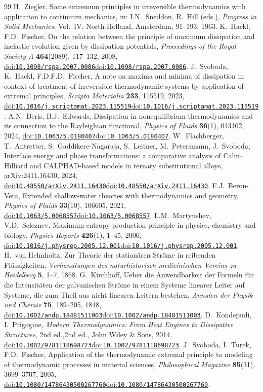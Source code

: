 \documentclass[12pt]{article}
\newif\ifhighlight \highlightfalse
\newif\ifhighlightfirst \highlightfirstfalse
\DeclareRobustCommand{\chg}[1]{\ifhighlight\ifhighlightfirst\textcolor{revised}{#1}\else#1\fi\else#1\fi}
\providecommand{\doi}[1]{\chg{\href{https://doi.org/#1}{doi:\nolinkurl{#1}}}}
\begin{document}
\begin{thebibliography}{99}
 H.~Ziegler, Some extremum principles in irreversible thermodynamics with application to continuum mechanics, in: I.N.~Sneddon, R.~Hill (eds.), \textit{Progress in Solid Mechanics}, Vol.~IV, North-Holland, Amsterdam, 91--193, 1963.
 K.~Hackl, F.D.~Fischer, On the relation between the principle of maximum dissipation and inelastic evolution given by dissipation potentials, \textit{Proceedings of the Royal Society A} \textbf{464}(2089), 117--132, 2008, \doi{10.1098/rspa.2007.0086}.
 J.~Svoboda, K.~Hackl, \chg{F.D.}~Fischer, A note on maxima and minima of dissipation in context of treatment of irreversible thermodynamic systems by application of extremal principles, \textit{Scripta Materialia} \textbf{233}, 115519, 2023, \doi{10.1016/j.scriptamat.2023.115519}.
 A.N.~Beris, B.J.~Edwards, Dissipation in nonequilibrium thermodynamics and its connection to the Rayleighian functional, \textit{Physics of Fluids} \textbf{36}(1), 013102, 2024, \doi{10.1063/5.0180407}.
 W.~Flachberger, T.~Antretter, S.~Gaddikere-Nagaraja, S.~Leitner, M.~Petersmann, J.~Svoboda, Interface energy and phase transformations: a comparative analysis of Cahn--Hilliard and CALPHAD-based models in ternary substitutional alloys, arXiv:2411.16430, 2024, \doi{10.48550/arXiv.2411.16430}.
 F.J.~Beron-Vera, Extended shallow-water theories with thermodynamics and geometry, \textit{Physics of Fluids} \textbf{33}(10), 106605, 2021, \doi{10.1063/5.0068557}.
 L.M.~Martyushev, V.D.~Seleznev, Maximum entropy production principle in physics, chemistry and biology, \textit{Physics Reports} \textbf{426}(1), 1--45, 2006, \doi{10.1016/j.physrep.2005.12.001}.
 H.~von Helmholtz, Zur Theorie der station\"aren Str\"ome in reibenden Fl\"ussigkeiten, \textit{Verhandlungen des naturhistorisch-medicinischen Vereins zu Heidelberg} \textbf{5}, 1--7, 1868.
 G.~Kirchhoff, Ueber die Anwendbarkeit der Formeln f\"ur die Intensit\"aten der galvanischen Str\"ome in einem Systeme linearer Leiter auf Systeme, die zum Theil aus nicht linearen Leitern bestehen, \textit{Annalen der Physik und Chemie} \textbf{75}, 189--205, 1848, \doi{10.1002/andp.18481511003}.
 D.~Kondepudi, I.~Prigogine, \textit{Modern Thermodynamics: From Heat Engines to Dissipative Structures}, \chg{2nd ed.,} John Wiley \& Sons, 2014, \doi{10.1002/9781118698723}.
 J.~Svoboda, I.~Turek, F.D.~Fischer, Application of the thermodynamic extremal principle to modeling of thermodynamic processes in material sciences, \textit{Philosophical Magazine} \textbf{85}(31), 3699--3707, 2005, \doi{10.1080/14786430500267760}.

\end{thebibliography}
\end{document}
